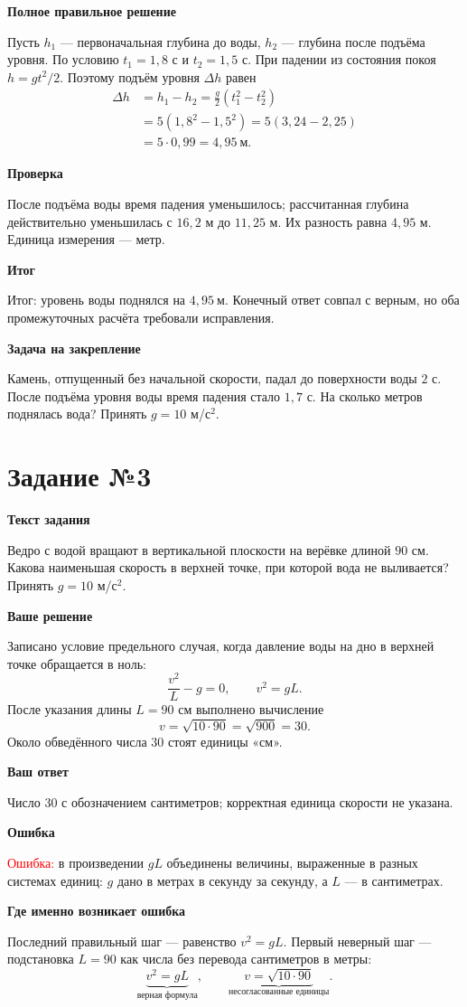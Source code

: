 \documentclass[12pt,a4paper]{article}
\newcommand{\taskheading}[1]{\phantomsection\label{task:#1}\section*{Задание №#1}}
\newcommand{\reviewline}[1]{\par\medskip\textbf{#1}\par\smallskip}
\begin{document}
\reviewline{Полное правильное решение}
Пусть $h_1$ --- первоначальная глубина до воды, $h_2$ --- глубина после подъёма уровня. По условию $t_1=1{,}8$ с и $t_2=1{,}5$ с. При падении из состояния покоя $h=gt^2/2$. Поэтому подъём уровня $\Delta h$ равен
\[
\begin{aligned}
\Delta h&=h_1-h_2
=\frac{g}{2}(t_1^2-t_2^2)\\
&=5(1{,}8^2-1{,}5^2)
=5(3{,}24-2{,}25)\\
&=5\cdot0{,}99=4{,}95\ \text{м}.
\end{aligned}
\]

\reviewline{Проверка}
После подъёма воды время падения уменьшилось; рассчитанная глубина действительно уменьшилась с $16{,}2$ м до $11{,}25$ м. Их разность равна $4{,}95$ м. Единица измерения --- метр.

\reviewline{Итог}
\textcolor{teal!60!black}{Итог:} уровень воды поднялся на $\boxed{4{,}95\ \text{м}}$. Конечный ответ совпал с верным, но оба промежуточных расчёта требовали исправления.

\reviewline{Задача на закрепление}
Камень, отпущенный без начальной скорости, падал до поверхности воды $2$ с. После подъёма уровня воды время падения стало $1{,}7$ с. На сколько метров поднялась вода? Принять $g=10$ м/с$^2$.

\newpage
\taskheading{3}
\reviewline{Текст задания}
Ведро с водой вращают в вертикальной плоскости на верёвке длиной $90$ см. Какова наименьшая скорость в верхней точке, при которой вода не выливается? Принять $g=10$ м/с$^2$.

\reviewline{Ваше решение}
Записано условие предельного случая, когда давление воды на дно в верхней точке обращается в ноль:
\[
\frac{v^2}{L}-g=0,\qquad v^2=gL.
\]
После указания длины $L=90$ см выполнено вычисление
\[
 v=\sqrt{10\cdot90}=\sqrt{900}=30.
\]
Около обведённого числа $30$ стоят единицы «см».

\reviewline{Ваш ответ}
Число $30$ с обозначением сантиметров; корректная единица скорости не указана.

\reviewline{Ошибка}
\textcolor{red}{Ошибка:} в произведении $gL$ объединены величины, выраженные в разных системах единиц: $g$ дано в метрах в секунду за секунду, а $L$ --- в сантиметрах.

\reviewline{Где именно возникает ошибка}
Последний правильный шаг --- равенство $v^2=gL$. Первый неверный шаг --- подстановка $L=90$ как числа без перевода сантиметров в метры:
\[
\underbrace{v^2=gL}_{\text{верная формула}},\qquad
\underbrace{v=\sqrt{10\cdot90}}_{\text{несогласованные единицы}}.
\]
\end{document}
